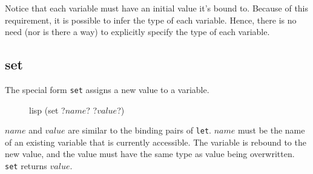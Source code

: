 Notice that each variable must have an initial value it's bound to. Because of this requirement, it is possible to infer the type of each variable. Hence, there is no need (nor is there a way) to explicitly specify the type of each variable.

\subsection{set}
The special form \texttt{set} assigns a new value to a variable.

\begin{figure}[htp]
    \centering
    \begin{cminted}[autogobble=true, escapeinside=??]{lisp}
        (set ?$name$? ?$value$?)
    \end{cminted}
    \captionsetup[figure]{font=small}
\end{figure}

$name$ and $value$ are similar to the binding pairs of \texttt{let}. $name$ must be the name of an existing variable that is currently accessible. The variable is rebound to the new value, and the value must have the same type as value being overwritten. \texttt{set} returns $value$.
